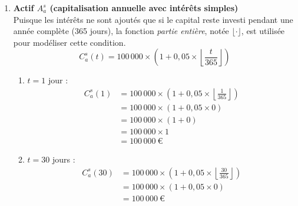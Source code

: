 \documentclass{article}
\begin{document}
\begin{enumerate}[label=\textbf{R1.\arabic*}]
	\item \textbf{Actif \( A_a^s \) (capitalisation annuelle avec intérêts simples)} \\
	      Puisque les intérêts ne sont ajoutés que si le capital reste investi pendant une année complète (365 jours), la fonction \emph{partie entière}, notée $\lfloor \cdot \rfloor$, est utilisée pour modéliser cette condition.
	      \[
	      	C_a^s(t) = 100\,000 \times \left(1 + 0,05 \times \left\lfloor \frac{t}{365} \right\rfloor \right)
	      \]
	      \begin{enumerate}[label=(\alph*)]
	      	\item \( t = 1 \) jour : 
	      	      \begin{align*}
	      	      	C_a^s(1) & = 100\,000 \times \left(1 + 0,05 \times \left\lfloor \frac{1}{365} \right\rfloor \right) \\
	      	      	         & = 100\,000 \times \left(1 + 0,05 \times 0 \right)                                        \\
	      	      	         & = 100\,000 \times (1 + 0)                                                                \\
	      	      	         & = 100\,000 \times 1                                                                      \\
	      	      	         & = \boxed{100\,000\ \text{€}}                                                           
	      	      \end{align*}
	      	              
	      	\item \( t = 30 \) jours : 
	      	      \begin{align*}
	      	      	C_a^s(30) & = 100\,000 \times \left(1 + 0,05 \times \left\lfloor \frac{30}{365} \right\rfloor \right) \\
	      	      	          & = 100\,000 \times \left(1 + 0,05 \times 0 \right)                                         \\
	      	      	          & = \boxed{100\,000\ \text{€}}                                                            
	      	      \end{align*}
	      	              

\end{enumerate}
\end{enumerate}
\end{document}
